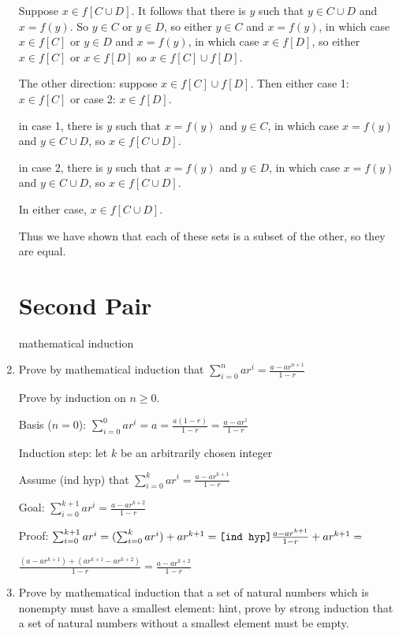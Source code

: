 \documentclass[12pt]{article}
\begin{document}
\begin{enumerate}
Suppose $x \in f[C \cup D]$.  It follows that there is $y$ such that $y \in C \cup D$ and $x=f(y)$. So $y \in C$ or $y \in D$, so
either $y \in C$ and $x=f(y)$, in which case $x \in f[C]$ or $y \in D$ and $x=f(y)$, in which case $x\in f[D]$, so either $x \in f[C]$ or $x \in f[D]$ so $x \in f[C] \cup f[D]$. 

The other direction:  suppose $x \in f[C] \cup f[D]$.  Then either case 1: $x \in f[C]$ or case 2: $x \in f[D]$.

in case 1, there is $y$ such that $x=f(y)$ and $y \in C$, in which case $x=f(y)$ and $y \in C\cup D$, so $x \in f[C \cup D]$.

in case 2, there is $y$ such that $x=f(y)$ and $y \in D$, in which case $x=f(y)$ and $y \in C\cup D$, so $x \in f[C \cup D]$.

In either case, $x \in f[C\cup D]$.

Thus we have shown that each of these sets is a subset of the other, so they are equal.

\newpage

\section{Second Pair}

mathematical induction

\item   Prove by mathematical induction that $\sum_{i=0}^n ar^i = \frac{a - ar^{n+1}}{1-r}$

Prove by induction on $n \geq 0$.

Basis ($n=0$):  $\sum_{i=0}^0 ar^i = a = \frac{a(1-r)}{1-r} = \frac{a-ar^1}{1-r}$

Induction step:  let $k$ be an arbitrarily chosen integer

Assume (ind hyp) that $\sum_{i=0}^k ar^i = \frac{a - ar^{k+1}}{1-r}$

Goal:  $\sum_{i=0}^{k+1} ar^i = \frac{a - ar^{k+2}}{1-r}$

Proof:   $\sum_{i=0}^{k+1} ar^i = (\sum_{i=0}^{k} ar^i)+ar^{k+1} = \verb|[ind hyp]| \frac{a - ar^{k+1}}{1-r} + ar^{k+1}=$

$\frac{(a-ar^{k+1}) + (ar^{k+1} - ar^{k+2})}{1-r} = \frac{a - ar^{k+2}}{1-r}$

\newpage

\item  Prove by mathematical induction that a set of natural numbers which is nonempty must have a smallest element:  hint, prove by strong induction
that a set of natural numbers without a smallest element must be empty.


\end{enumerate}
\end{document}
